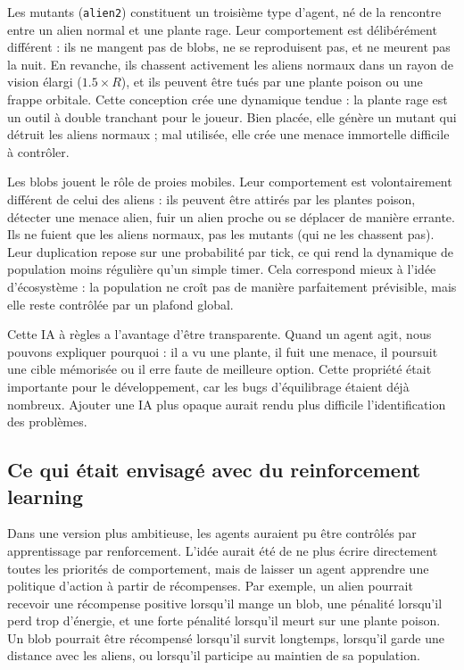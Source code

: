 ﻿\documentclass[11pt,a4paper]{article}
\begin{document}
Les mutants (\texttt{alien2}) constituent un troisième type d'agent, né de la rencontre entre un alien normal et une plante rage. Leur comportement est délibérément différent : ils ne mangent pas de blobs, ne se reproduisent pas, et ne meurent pas la nuit. En revanche, ils chassent activement les aliens normaux dans un rayon de vision élargi (\(1.5 \times R\)), et ils peuvent être tués par une plante poison ou une frappe orbitale. Cette conception crée une dynamique tendue : la plante rage est un outil à double tranchant pour le joueur. Bien placée, elle génère un mutant qui détruit les aliens normaux ; mal utilisée, elle crée une menace immortelle difficile à contrôler.

Les blobs jouent le rôle de proies mobiles. Leur comportement est volontairement différent de celui des aliens : ils peuvent être attirés par les plantes poison, détecter une menace alien, fuir un alien proche ou se déplacer de manière errante. Ils ne fuient que les aliens normaux, pas les mutants (qui ne les chassent pas). Leur duplication repose sur une probabilité par tick, ce qui rend la dynamique de population moins régulière qu'un simple timer. Cela correspond mieux à l'idée d'écosystème : la population ne croît pas de manière parfaitement prévisible, mais elle reste contrôlée par un plafond global.

Cette IA à règles a l'avantage d'être transparente. Quand un agent agit, nous pouvons expliquer pourquoi : il a vu une plante, il fuit une menace, il poursuit une cible mémorisée ou il erre faute de meilleure option. Cette propriété était importante pour le développement, car les bugs d'équilibrage étaient déjà nombreux. Ajouter une IA plus opaque aurait rendu plus difficile l'identification des problèmes.

\subsection{Ce qui était envisagé avec du reinforcement learning}

Dans une version plus ambitieuse, les agents auraient pu être contrôlés par apprentissage par renforcement. L'idée aurait été de ne plus écrire directement toutes les priorités de comportement, mais de laisser un agent apprendre une politique d'action à partir de récompenses. Par exemple, un alien pourrait recevoir une récompense positive lorsqu'il mange un blob, une pénalité lorsqu'il perd trop d'énergie, et une forte pénalité lorsqu'il meurt sur une plante poison. Un blob pourrait être récompensé lorsqu'il survit longtemps, lorsqu'il garde une distance avec les aliens, ou lorsqu'il participe au maintien de sa population.
\end{document}
